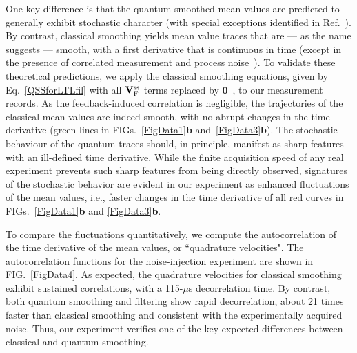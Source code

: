 \documentclass[aps,prx,twocolumn,amsmath,amssymb,superscriptaddress,floatfix,longbibliography
]{revtex4-2}
\begin{document}
One key difference is that the quantum-smoothed mean values are predicted to generally exhibit stochastic character (with special exceptions identified in Ref.~\cite{laverick2021quantum}). By contrast, classical smoothing yields mean value traces that are --- as the name suggests --- smooth, with a first derivative that is continuous in time (except in the presence of correlated measurement and process noise~\cite{laverick2021quantum}). To validate these theoretical predictions, we apply the classical smoothing equations, given by Eq.~\eqref{QSSforLTLfil} with all $\mathbf{V}_{\text F}^\text{ss}$ terms replaced by $\mathbf{0}$~\cite{fraser1969optimum}, to our measurement records. As the feedback-induced correlation is negligible, the trajectories of the classical mean values are indeed smooth, with no abrupt changes in the time derivative (green lines in FIGs.~\ref{FigData1}\textbf{b} and~\ref{FigData3}\textbf{b}). The stochastic behaviour of the quantum traces should, in principle, manifest as sharp features with an ill-defined time derivative. While the finite acquisition speed of any real experiment prevents such sharp features from being directly observed, signatures of the stochastic behavior are evident in our experiment as enhanced fluctuations of the mean values, i.e., faster changes in the time derivative of all red curves in FIGs.~\ref{FigData1}\textbf{b} and \ref{FigData3}\textbf{b}. 

To compare the fluctuations quantitatively, we compute the autocorrelation of the time derivative of the mean values, or ``quadrature velocities". The autocorrelation functions for the noise-injection experiment are shown in FIG.~\ref{FigData4}. As expected, the quadrature velocities for classical smoothing exhibit sustained correlations, with a 115-$\mu$s decorrelation time. By contrast, both quantum smoothing and filtering show rapid decorrelation, about 21 times faster than classical smoothing and consistent with the experimentally acquired noise. Thus, our experiment verifies one of the key expected differences between classical and quantum smoothing.
\end{document}
